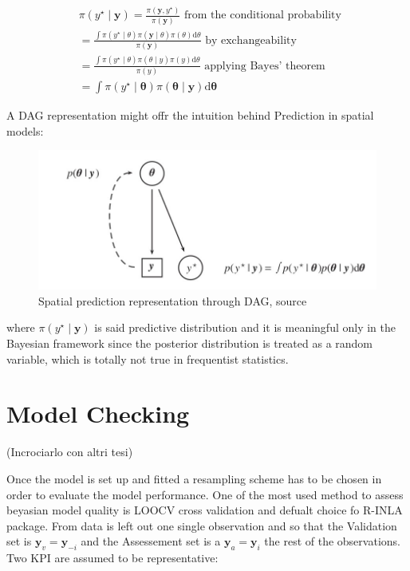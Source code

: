 \documentclass[
  12pt,
  a4paper,
  oneside]{book}
\theoremstyle{definition}
\theoremstyle{definition}
\theoremstyle{definition}
\theoremstyle{remark}
\begin{document}
\[
\begin{aligned}
&\pi\left(y^{\star} \mid \boldsymbol{y}\right)=\frac{\pi\left(\boldsymbol{y}, y^{\star}\right)}{\pi(\boldsymbol{y})} \text { from the conditional probability }\\
&=\frac{\int \pi\left(y^{\star} \mid \theta\right) \pi(\boldsymbol{y} \mid \theta) \pi(\theta) \mathrm{d} \theta}{\pi(\boldsymbol{y})} \text { by exchangeability }\\
&=\frac{\int \pi\left(y^{\star} \mid \theta\right) \pi(\theta \mid y) \pi(y) \mathrm{d} \theta}{\pi(y)} \text { applying Bayes' theorem }\\
&=\int \pi\left(y^{\star} \mid \boldsymbol{\theta}\right) \pi(\boldsymbol{\theta} \mid \boldsymbol{y}) \mathrm{d} \boldsymbol{\theta}
\end{aligned}
\]

A DAG representation might offr the intuition behind Prediction in spatial models:

\begin{figure}
\centering
\includegraphics{images/spatial_prediction.jpg}
\caption{Spatial prediction representation through DAG, source \citet{Blangiardo-Cameletti}}
\end{figure}

where \(\pi\left(y^{\star} \mid \boldsymbol{y}\right)\) is said predictive distribution and it is meaningful only in the Bayesian framework since the posterior distribution is treated as a random variable, which is totally not true in frequentist statistics.

\hypertarget{model-checking}{%
\section{Model Checking}\label{model-checking}}

(Incrociarlo con altri tesi)

Once the model is set up and fitted a resampling scheme has to be chosen in order to evaluate the model performance. One of the most used method to assess beyasian model quality is LOOCV cross validation and defualt choice fo R-INLA package. From data is left out one single observation and so that the Validation set is \(\boldsymbol{y}_{v} = \boldsymbol{y}_{-i}\) and the Assessement set is a \(\boldsymbol{y}_{a} = \boldsymbol{y}_{i}\)
the rest of the observations. Two KPI are assumed to be representative:
\end{document}
